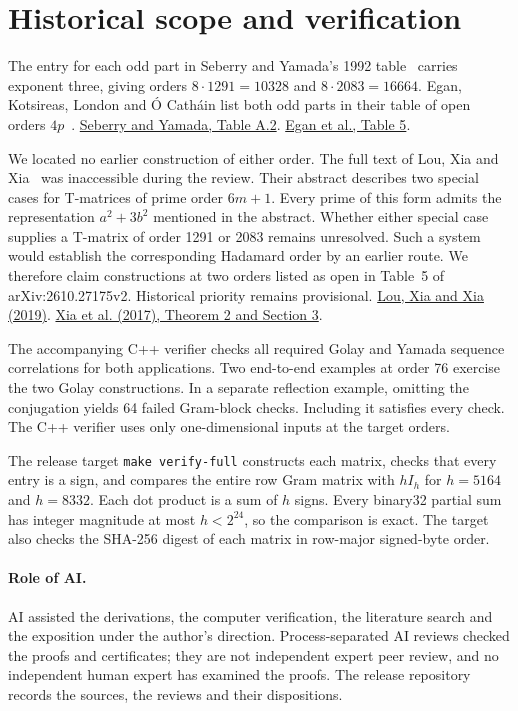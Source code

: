 \documentclass[10pt]{article}
\begin{document}
\section{Historical scope and verification}
The entry for each odd part in Seberry and Yamada's 1992 table~\cite{sy} carries exponent three, giving orders $8\cdot1291=10328$ and $8\cdot2083=16664$. Egan, Kotsireas, London and \'{O} Cath\'ain list both odd parts in their table of open orders $4p$~\cite{survey}. \href{https://documents.uow.edu.au/~jennie/WEBPDF/175_1992.pdf}{Seberry and Yamada, Table A.2}. \href{https://arxiv.org/pdf/2610.27175v2}{Egan et al., Table 5}.

We located no earlier construction of either order. The full text of Lou, Xia and Xia~\cite{lxx} was inaccessible during the review. Their abstract describes two special cases for T-matrices of prime order $6m+1$. Every prime of this form admits the representation $a^2+3b^2$ mentioned in the abstract. Whether either special case supplies a T-matrix of order 1291 or 2083 remains unresolved. Such a system would establish the corresponding Hadamard order by an earlier route. We therefore claim constructions at two orders listed as open in Table~5 of arXiv:2610.27175v2. Historical priority remains provisional. \href{https://doi.org/10.17654/DM021020163}{Lou, Xia and Xia (2019)}. \href{https://documents.uow.edu.au/~jennie/WEB/WEB17/Xtb32_6mp1.pdf}{Xia et al. (2017), Theorem 2 and Section 3}.

The accompanying C++ verifier checks all required Golay and Yamada sequence correlations for both applications. Two end-to-end examples at order 76 exercise the two Golay constructions. In a separate reflection example, omitting the conjugation yields 64 failed Gram-block checks. Including it satisfies every check. The C++ verifier uses only one-dimensional inputs at the target orders.

The release target \texttt{make verify-full} constructs each matrix, checks that every entry is a sign, and compares the entire row Gram matrix with $hI_h$ for $h=5164$ and $h=8332$. Each dot product is a sum of $h$ signs. Every binary32 partial sum has integer magnitude at most $h<2^{24}$, so the comparison is exact. The target also checks the SHA-256 digest of each matrix in row-major signed-byte order.

\paragraph{Role of AI.} AI assisted the derivations, the computer verification, the literature search and the exposition under the author's direction. Process-separated AI reviews checked the proofs and certificates; they are not independent expert peer review, and no independent human expert has examined the proofs. The release repository records the sources, the reviews and their dispositions.
\end{document}
